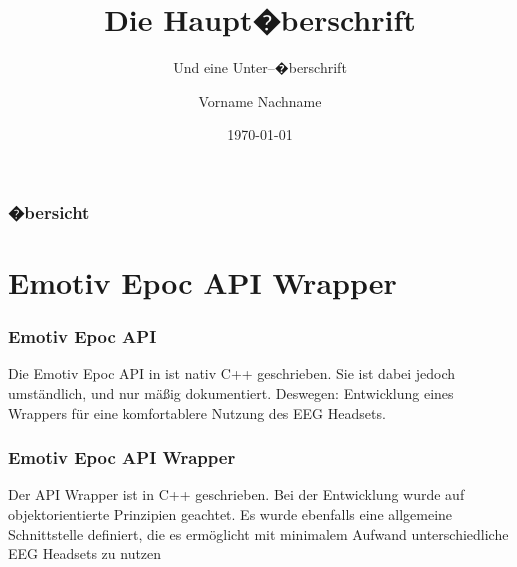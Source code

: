 \documentclass[german,ignorenonframetext]{beamer}
\institute[MT -- HAW Hamburg]{HAW Hamburg\\ Fakult�t DMI, Dept.\ Medientechnik}
\title[�berschrift]{Die Haupt�berschrift}
\subtitle{Und eine Unter--�berschrift}
\author[Name]{Vorname Nachname}
\date{\today}
\begin{document}
\frame{\titlepage}

\begin{frame}
  \frametitle{�bersicht}
  \tableofcontents
\end{frame}

\section{Emotiv Epoc API Wrapper} %

\begin{frame}
  \frametitle{Emotiv Epoc API}
  
Die Emotiv Epoc API in ist nativ C++ geschrieben.
Sie ist dabei jedoch umständlich, und nur mäßig dokumentiert.\pause
Deswegen: Entwicklung eines Wrappers für eine komfortablere Nutzung des EEG Headsets.

\end{frame}

\begin{frame}
  \frametitle{Emotiv Epoc API Wrapper}
  
Der API Wrapper ist in C++ geschrieben.
Bei der Entwicklung wurde auf objektorientierte Prinzipien geachtet.
Es wurde ebenfalls eine allgemeine Schnittstelle definiert, die es ermöglicht mit minimalem Aufwand unterschiedliche EEG Headsets zu nutzen

\end{frame}
\end{document}
